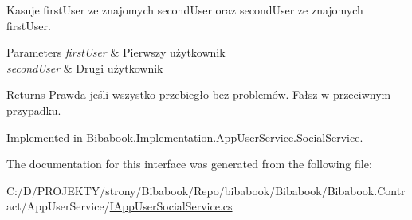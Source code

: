 Kasuje first\+User ze znajomych second\+User oraz second\+User ze znajomych first\+User. 


\begin{DoxyParams}{Parameters}
{\em first\+User} & Pierwszy użytkownik\\
\hline
{\em second\+User} & Drugi użytkownik\\
\hline
\end{DoxyParams}
\begin{DoxyReturn}{Returns}
Prawda jeśli wszystko przebiegło bez problemów. Fałsz w przeciwnym przypadku.
\end{DoxyReturn}


Implemented in \hyperlink{class_bibabook_1_1_implementation_1_1_app_user_service_1_1_social_service_a61e408d86571a9571b1130395779eba3}{Bibabook.\+Implementation.\+App\+User\+Service.\+Social\+Service}.



The documentation for this interface was generated from the following file\+:\begin{DoxyCompactItemize}
\item 
C\+:/\+D/\+P\+R\+O\+J\+E\+K\+T\+Y/strony/\+Bibabook/\+Repo/bibabook/\+Bibabook/\+Bibabook.\+Contract/\+App\+User\+Service/\hyperlink{_i_app_user_social_service_8cs}{I\+App\+User\+Social\+Service.\+cs}\end{DoxyCompactItemize}
